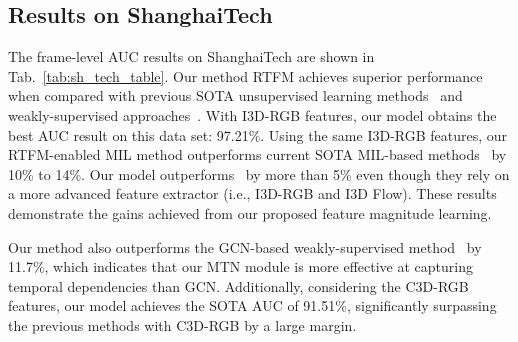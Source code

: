 \documentclass[10pt,twocolumn,letterpaper]{article}
\begin{document}
\subsection{Results on ShanghaiTech}
The frame-level AUC results on ShanghaiTech are shown in Tab.~\ref{tab:sh_tech_table}. Our method RTFM achieves superior performance when compared with previous SOTA unsupervised learning methods~\cite{hasan2016learning,luo2017revisit,liu2018future,Park_2020_CVPR,yu2020cloze} and weakly-supervised approaches~\cite{9102722,8803657,zhong2019graph}. With I3D-RGB features, our model obtains the best AUC result on this data set: 97.21\%. Using the same I3D-RGB features, our RTFM-enabled MIL method outperforms current SOTA MIL-based methods~\cite{sultani2018real,8803657,9102722} by 10\% to 14\%. Our model outperforms~\cite{9102722} by more than 5\% even though they rely on a more advanced feature extractor (i.e., I3D-RGB and I3D Flow). These results demonstrate the gains achieved from our proposed feature magnitude learning.
  

Our method also outperforms the GCN-based weakly-supervised method~\cite{zhong2019graph} by  11.7\%, which indicates that our MTN module is more effective at capturing temporal dependencies than GCN. 
Additionally, considering the C3D-RGB features, our model achieves the SOTA AUC of 91.51\%, significantly surpassing the previous methods with C3D-RGB by a large margin. 
\end{document}
